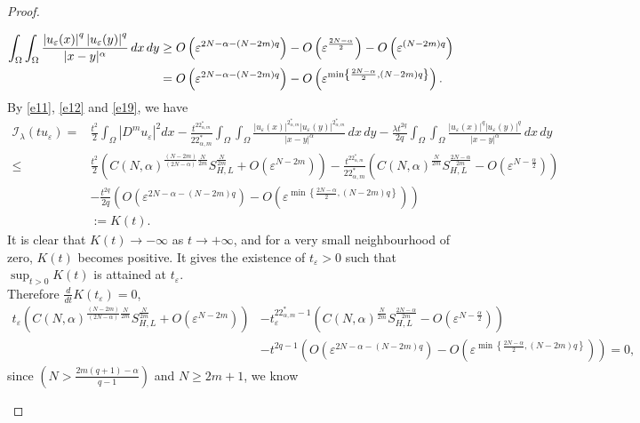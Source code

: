 \documentclass[reqno]{amsart}
\newcommand{\DD} {\displaystyle}
\newcommand{\la} {\lambda}
\newcommand{\eps}{\varepsilon}
\newcommand{\Om}{\Omega}
\newcommand{\al} {\alpha}
\newcommand{\mc} {\mathcal}
\numberwithin{theorem}{section} \numberwithin{equation}{section}
\begin{document}
\begin{proof}
\begin{enumerate}
\begin{align}\label{e19}
\int_{\Om} \int_{\Om} \frac{\left|u_{\eps}(x)\right|^q\left|u_{\eps}(y)\right|^q}{|x-y|^\al} \, dx \, dy & \geq O\left(\eps^{2N-\al-(N-2m) q}\right)-O\left(\eps^{\frac{2N-\al}{2}}\right)-O\left(\eps^{(N-2m) q}\right)\notag \\
& =O\left(\eps^{2N-\al-(N-2m) q}\right)-O\left(\eps^{\min \left\{\frac{2N-\al}{2},   (N-2m) q\right\}}\right).
\end{align}
By \eqref{e11}, \eqref{e12} and \eqref{e19}, we have
\begin{align*}
\mc{I_\la}\left(t u_{\eps}\right)=&\frac{t^2}{2} \int_{\Om}\left|D^m u_{\eps}\right|^2 d x-\frac{t^{22_{\al, m}^*}}{22_{\al, m}^*} \int_{\Om} \int_{\Om} \frac{\left|u_{\eps}(x)\right|^{2_{\al, m}^*}\left|u_{\eps}(y)\right|^{2_{\al, m}^*}}{|x-y|^\al} \, dx \, dy-\frac{\la t^{2 q}}{2 q} \int_{\Om} \int_{\Om} \frac{\left|u_{\eps}(x)\right|^q\left|u_{\eps}(y)\right|^q}{|x-y|^\al} \, dx \, dy\\
\leq&  \frac{t^2}{2}\left(C(N, \al)^{\frac{(N-2m)}{(2N-\al)}\frac{N}{2m}} S_{H, L}^{\frac{N}{2m}}+O\left(\eps^{N-2m}\right)\right)-\frac{t^{22_{\al, m}^*}}{22_{\al, m}^*}\left(C(N, \al)^{\frac{N}{2m}} S_{H, L}^{\frac{2N-\al}{2m}}-O\left(\eps^{N-\frac{\al}{2}}\right)\right) \\
\qquad \, & -\frac{t^{2q}}{2q}\left(O\left(\eps^{2N-\al-(N-2m)q}\right)-O\left(\eps^{\min \left\{\frac{2N-\al}{2}, (N-2m)q\right\}}\right) \right)\\
&:=  K(t).
\end{align*}
It is clear that $K(t) \rightarrow-\infty$ as $t \rightarrow+\infty$, and for a very small neighbourhood of zero, $K(t)$ becomes positive. It gives the existence of $t_{\eps}>0$ such that $\displaystyle\sup_{t>0} K(t)$ is attained at $t_{\eps}$.\\
Therefore $\DD\frac{d}{dt} K(t_\eps) =0$,
\begin{align*}
t_{\eps}\left(C(N, \al)^{\frac{(N-2m)}{(2N-\al)} \frac{N}{2m}} S_{H, L}^{\frac{N}{2m}}+O\left(\eps^{N-2m}\right)\right) & -t_{\eps}^{22_{\al, m}^*-1}\left(C(N, \al)^{\frac{N}{2m}} S_{H, L}^{\frac{2N-\al}{2m}}-O\left(\eps^{N-\frac{\al}{2}}\right)\right) \\
& -t^{2 q-1}\left(O\left(\eps^{2N-\al-(N-2m) q}\right)-O\left(\eps^{\min \left\{\frac{2N-\al}{2}, (N-2m)q\right\}}\right)\right)=0,
\end{align*}
since $\left(N>\frac{2m(q+1)-\al}{q-1}\right)$ and $N \geq 2m+1$, we know
\begin{equation}\label{e20}

\end{equation}
\end{enumerate}
\end{proof}
\end{document}
